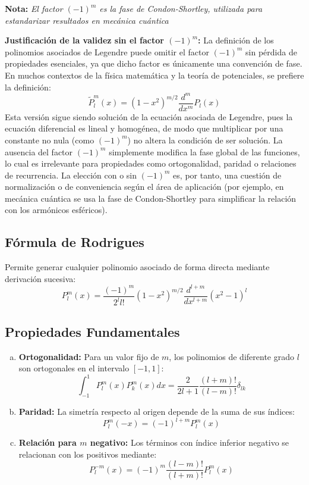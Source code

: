 \documentclass[a4paper]{article}
\begin{document}
    \textbf{Nota: }\textit{El factor $(-1)^m$ es la fase de Condon-Shortley, utilizada para estandarizar resultados en mecánica cuántica}

\textbf{Justificación de la validez sin el factor $(-1)^m$:}  
La definición de los polinomios asociados de Legendre puede omitir el factor $(-1)^m$ sin pérdida de propiedades esenciales, ya que dicho factor es únicamente una convención de fase. En muchos contextos de la física matemática y la teoría de potenciales, se prefiere la definición:
    $$\tilde{P}_l^m(x) = (1-x^2)^{m/2} \frac{d^m}{dx^m} P_l(x)$$
Esta versión sigue siendo solución de la ecuación asociada de Legendre, pues la ecuación diferencial es lineal y homogénea, de modo que multiplicar por una constante no nula (como $(-1)^m$) no altera la condición de ser solución. La ausencia del factor $(-1)^m$ simplemente modifica la fase global de las funciones, lo cual es irrelevante para propiedades como ortogonalidad, paridad o relaciones de recurrencia. La elección con o sin $(-1)^m$ es, por tanto, una cuestión de normalización o de conveniencia según el área de aplicación (por ejemplo, en mecánica cuántica se usa la fase de Condon-Shortley para simplificar la relación con los armónicos esféricos).


\subsection{Fórmula de Rodrigues}

Permite generar cualquier polinomio asociado de forma directa mediante derivación sucesiva:
    $$P_l^m(x) = \frac{(-1)^m}{2^l l!} (1-x^2)^{m/2} \frac{d^{l+m}}{dx^{l+m}} (x^2-1)^l$$


\subsection{Propiedades Fundamentales}
\begin{enumerate}[a)]
    \item \textbf{Ortogonalidad:} Para un valor fijo de $m$, los polinomios de diferente grado $l$ son ortogonales en el intervalo $[-1, 1]$:
    $$\int_{-1}^{1} P_l^m(x) P_k^m(x) dx = \frac{2}{2l+1} \frac{(l+m)!}{(l-m)!} \delta_{lk}$$
    \item \textbf{Paridad:} La simetría respecto al origen depende de la suma de sus índices:
    $$P_l^m(-x) = (-1)^{l+m} P_l^m(x)$$
    \item \textbf{Relación para $m$ negativo:} Los términos con índice inferior negativo se relacionan con los positivos mediante:
    $$P_l^{-m}(x) = (-1)^m \frac{(l-m)!}{(l+m)!} P_l^m(x)$$
\end{enumerate}
\end{document}
